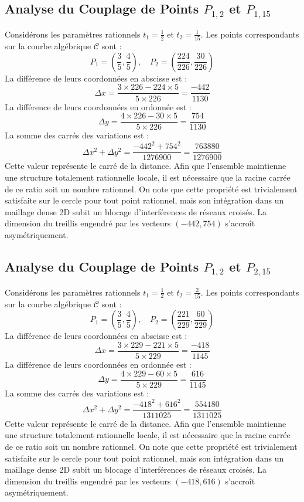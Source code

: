 \documentclass[12pt, a4paper]{article}
\begin{document}
\subsection{Analyse du Couplage de Points $P_{1,2}$ et $P_{1,15}$}
Considérons les paramètres rationnels $t_1 = \frac{1}{2}$ et $t_2 = \frac{1}{15}$.
Les points correspondants sur la courbe algébrique $\mathcal{C}$ sont :
$$ P_1 = \left( \frac{3}{5}, \frac{4}{5} \right), \quad P_2 = \left( \frac{224}{226}, \frac{30}{226} \right) $$
La différence de leurs coordonnées en abscisse est :
$$ \Delta x = \frac{3 \times 226 - 224 \times 5}{5 \times 226} = \frac{-442}{1130} $$
La différence de leurs coordonnées en ordonnée est :
$$ \Delta y = \frac{4 \times 226 - 30 \times 5}{5 \times 226} = \frac{754}{1130} $$
La somme des carrés des variations est :
$$ \Delta x^2 + \Delta y^2 = \frac{ -442^2 + 754^2 }{ 1276900 } = \frac{ 763880 }{ 1276900 } $$
Cette valeur représente le carré de la distance. Afin que l'ensemble maintienne une structure totalement rationnelle locale, il est nécessaire que la racine carrée de ce ratio soit un nombre rationnel. On note que cette propriété est trivialement satisfaite sur le cercle pour tout point rationnel, mais son intégration dans un maillage dense 2D subit un blocage d'interférences de réseaux croisés. La dimension du treillis engendré par les vecteurs $( -442, 754 )$ s'accroît asymétriquement.


\subsection{Analyse du Couplage de Points $P_{1,2}$ et $P_{2,15}$}
Considérons les paramètres rationnels $t_1 = \frac{1}{2}$ et $t_2 = \frac{2}{15}$.
Les points correspondants sur la courbe algébrique $\mathcal{C}$ sont :
$$ P_1 = \left( \frac{3}{5}, \frac{4}{5} \right), \quad P_2 = \left( \frac{221}{229}, \frac{60}{229} \right) $$
La différence de leurs coordonnées en abscisse est :
$$ \Delta x = \frac{3 \times 229 - 221 \times 5}{5 \times 229} = \frac{-418}{1145} $$
La différence de leurs coordonnées en ordonnée est :
$$ \Delta y = \frac{4 \times 229 - 60 \times 5}{5 \times 229} = \frac{616}{1145} $$
La somme des carrés des variations est :
$$ \Delta x^2 + \Delta y^2 = \frac{ -418^2 + 616^2 }{ 1311025 } = \frac{ 554180 }{ 1311025 } $$
Cette valeur représente le carré de la distance. Afin que l'ensemble maintienne une structure totalement rationnelle locale, il est nécessaire que la racine carrée de ce ratio soit un nombre rationnel. On note que cette propriété est trivialement satisfaite sur le cercle pour tout point rationnel, mais son intégration dans un maillage dense 2D subit un blocage d'interférences de réseaux croisés. La dimension du treillis engendré par les vecteurs $( -418, 616 )$ s'accroît asymétriquement.
\end{document}
